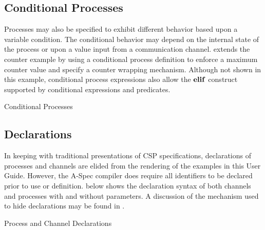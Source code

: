 \documentclass[letterpaper,10pt,draft]{book}
\begin{document}
\subsection{Conditional Processes}
   \label{sect:CondProc}

Processes may also be specified to exhibit different behavior based upon a variable
condition.  The conditional behavior may depend on the internal state of the process
or upon a value input from a communication channel.   extends
the counter example by using a conditional process definition to enforce a maximum
counter value and specify a counter wrapping mechanism.  Although not shown in this
example, conditional process expressions also allow the ${\bf elif}$ construct supported
by conditional expressions and predicates.

\begin{example}
\begin{minipage}[t]{0.49\linewidth}
   
\end{minipage}
\begin{minipage}[t]{0.49\linewidth}
   \azbox
   
\end{minipage}

   \caption{Conditional Processes}
   \label{ex:ProcCond}
\end{example}

\subsection{Declarations}
   \label{sect:ProcDecl}

In keeping with traditional presentations of CSP specifications, declarations of
processes and channels are elided from the rendering of the examples in this User
Guide.  However, the A-Spec compiler does require all identifiers to be declared
prior to use or definition.   below shows the declaration syntax
of both channels and processes with and without parameters.  A discussion of the
mechanism used to hide declarations may be found in .

\begin{example}
\begin{minipage}[t]{0.49\linewidth}
   
\end{minipage}
\begin{minipage}[t]{0.49\linewidth}
   \azbox
   
\end{minipage}

   \caption{Process and Channel Declarations}
   \label{ex:ProcDecl}
\end{example}
\end{document}

